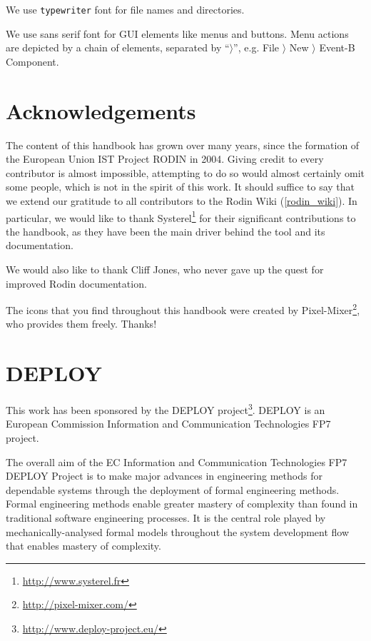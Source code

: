 \documentclass{book}
\begin{document}

We use \texttt{typewriter} font for file names and directories.

We use \textsf{sans serif font} for GUI elements like menus and buttons.  Menu actions are depicted by a chain of elements, separated by ``$\rangle$'', e.g. \textsf{File $\rangle$ New $\rangle$ Event-B Component}.

\section{Acknowledgements}
\label{sec:acknowledgements}

The content of this handbook has grown over many years, since the formation of the European Union IST Project RODIN in 2004.  Giving credit to every contributor is almost impossible, attempting to do so would almost certainly omit some people, which is not in the spirit of this work.  It should suffice to say that we extend our gratitude to all contributors to the Rodin Wiki (\ref{rodin_wiki}). In particular, we would like to thank Systerel\footnote{\url{http://www.systerel.fr}} for their significant contributions to the handbook, as they have been the main driver behind the tool and its documentation.

We would also like to thank Cliff Jones, who never gave up the quest for improved Rodin documentation.

The icons that you find throughout this handbook were created by Pixel-Mixer\footnote{\url{http://pixel-mixer.com/}}, who provides them freely.  Thanks!

\section{DEPLOY}
\label{deploy}

This work has been sponsored by the DEPLOY project\footnote{\url{http://www.deploy-project.eu/}}.  DEPLOY is an European Commission Information and Communication Technologies FP7 project.

The overall aim of the EC Information and Communication Technologies FP7 DEPLOY Project is to make major advances in engineering methods for dependable systems through the deployment of formal engineering methods. Formal engineering methods enable greater mastery of complexity than found in traditional software engineering processes. It is the central role played by mechanically-analysed formal models throughout the system development flow that enables mastery of complexity.
\end{document}
